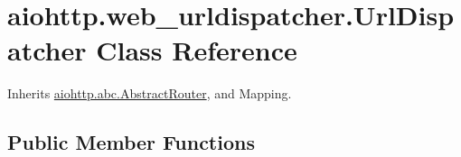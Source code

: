 \hypertarget{classaiohttp_1_1web__urldispatcher_1_1_url_dispatcher}{}\section{aiohttp.\+web\+\_\+urldispatcher.\+Url\+Dispatcher Class Reference}
\label{classaiohttp_1_1web__urldispatcher_1_1_url_dispatcher}


Inherits \hyperlink{classaiohttp_1_1abc_1_1_abstract_router}{aiohttp.\+abc.\+Abstract\+Router}, and Mapping.

\subsection*{Public Member Functions}
